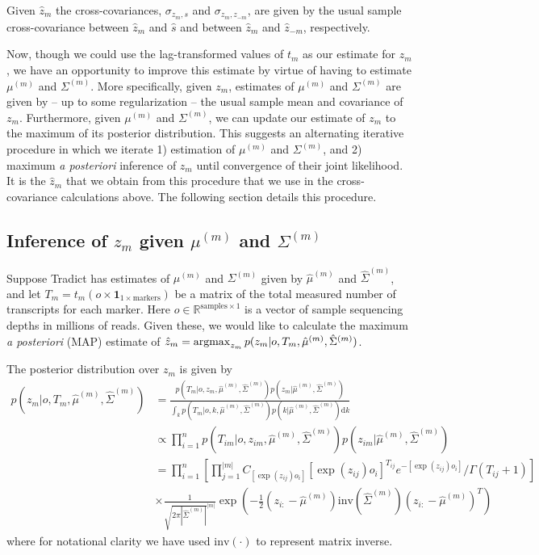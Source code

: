 \documentclass[10pt]{article}
\newcommand{\argmax}{\operatornamewithlimits{argmax}}
\begin{document}
Given $\hat{z}_m$ the cross-covariances, $\sigma_{z_m,s}$ and $\sigma_{z_m,z_{-m}}$, are given by the usual sample cross-covariance between $\hat{z}_m$ and $\hat{s}$ and between $\hat{z}_m$ and $\hat{z}_{-m}$, respectively. 

Now, though we could use the lag-transformed values of $t_m$ as our estimate for $z_m$, we have an opportunity to improve this estimate by virtue of having to estimate $\mu^{(m)}$ and  $\Sigma^{(m)}$. More specifically, given $z_m$, estimates of $\mu^{(m)}$ and  $\Sigma^{(m)}$ are given by -- up to some regularization -- the usual sample mean and covariance of $z_m$. Furthermore, given $\mu^{(m)}$ and  $\Sigma^{(m)}$, we can update our estimate of $z_m$ to the maximum of its posterior distribution. This suggests an alternating iterative procedure in which we iterate 1) estimation of $\mu^{(m)}$ and  $\Sigma^{(m)}$, and 2) maximum \emph{a posteriori} inference of $z_m$ until convergence of their joint likelihood. It is the $\hat{z}_m$ that we obtain from this procedure that we use in the cross-covariance calculations above. The following section details this procedure.



\subsection{Inference of $z_m$ given $\mu^{(m)}$ and $\Sigma^{(m)}$}

Suppose Tradict has estimates of $\mu^{(m)}$ and $\Sigma^{(m)}$ given by $\hat{\mu}^{(m)}$ and $\hat{\Sigma}^{(m)}$, and let $T_m = t_m(o \times \textbf{1}_{1 \times \textrm{markers}} )$ be a matrix of the total measured number of transcripts for each marker. Here $o \in \mathbb{R}^{\textrm{samples} \times 1}$ is a vector of sample sequencing depths in millions of reads. Given these, we would like to calculate the maximum \emph{a posteriori} (MAP) estimate of $\hat{z}_m = \argmax_{z_m} p(z_m | o, T_m, \hat{\mu}^{(m)}, \hat{\Sigma}^{(m)}) $. 

The posterior distribution over $z_m$ is given by 
\begin{align*}
p(z_m| o, T_m, \hat{\mu}^{(m)}, \hat{\Sigma}^{(m)}) & =  \frac{p(T_m | o, z_m, \hat{\mu}^{(m)}, \hat{\Sigma}^{(m)}) p(z_m| \hat{\mu}^{(m)}, \hat{\Sigma}^{(m)}) }{ \int_k  p(T_m | o, k, \hat{\mu}^{(m)}, \hat{\Sigma}^{(m)}) p(k | \hat{\mu}^{(m)}, \hat{\Sigma}^{(m)}) \textrm{d}k } \\
& \propto \prod_{i=1}^{n}  p(T_{im} | o, z_{im}, \hat{\mu}^{(m)}, \hat{\Sigma}^{(m)}) p(z_{im}| \hat{\mu}^{(m)}, \hat{\Sigma}^{(m)}) \\
& = \prod_{i=1}^{n} \left[ \prod_{j=1}^{|m|} C_{[\exp(z_{ij})o_i]} [\exp(z_{ij})o_i]^{T_{ij}}  e^{-[\exp(z_{ij})o_i]} / \Gamma(T_{ij} + 1) \right] \\ 
& \times \frac{1}{\sqrt{2\pi|\hat{\Sigma}^{(m)}|}^{|m|}}\exp\left(-\frac{1}{2}(z_{i:}-\hat{\mu}^{(m)}) \textrm{inv}\left( \hat{\Sigma}^{(m)} \right)(z_{i:}-\hat{\mu}^{(m)})^T \right)
\end{align*}
where for notational clarity we have used $\textrm{inv}(\cdot)$ to represent matrix inverse. 
\end{document}
